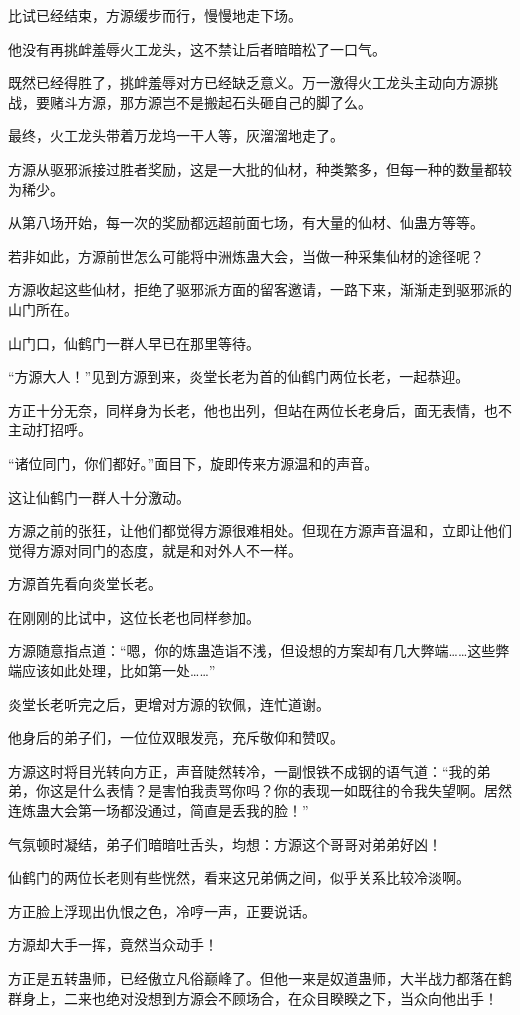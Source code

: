 \begin{this_body}
比试已经结束，方源缓步而行，慢慢地走下场。

他没有再挑衅羞辱火工龙头，这不禁让后者暗暗松了一口气。

既然已经得胜了，挑衅羞辱对方已经缺乏意义。万一激得火工龙头主动向方源挑战，要赌斗方源，那方源岂不是搬起石头砸自己的脚了么。

最终，火工龙头带着万龙坞一干人等，灰溜溜地走了。

方源从驱邪派接过胜者奖励，这是一大批的仙材，种类繁多，但每一种的数量都较为稀少。

从第八场开始，每一次的奖励都远超前面七场，有大量的仙材、仙蛊方等等。

若非如此，方源前世怎么可能将中洲炼蛊大会，当做一种采集仙材的途径呢？

方源收起这些仙材，拒绝了驱邪派方面的留客邀请，一路下来，渐渐走到驱邪派的山门所在。

山门口，仙鹤门一群人早已在那里等待。

“方源大人！”见到方源到来，炎堂长老为首的仙鹤门两位长老，一起恭迎。

方正十分无奈，同样身为长老，他也出列，但站在两位长老身后，面无表情，也不主动打招呼。

“诸位同门，你们都好。”面目下，旋即传来方源温和的声音。

这让仙鹤门一群人十分激动。

方源之前的张狂，让他们都觉得方源很难相处。但现在方源声音温和，立即让他们觉得方源对同门的态度，就是和对外人不一样。

方源首先看向炎堂长老。

在刚刚的比试中，这位长老也同样参加。

方源随意指点道：“嗯，你的炼蛊造诣不浅，但设想的方案却有几大弊端……这些弊端应该如此处理，比如第一处……”

炎堂长老听完之后，更增对方源的钦佩，连忙道谢。

他身后的弟子们，一位位双眼发亮，充斥敬仰和赞叹。

方源这时将目光转向方正，声音陡然转冷，一副恨铁不成钢的语气道：“我的弟弟，你这是什么表情？是害怕我责骂你吗？你的表现一如既往的令我失望啊。居然连炼蛊大会第一场都没通过，简直是丢我的脸！”

气氛顿时凝结，弟子们暗暗吐舌头，均想：方源这个哥哥对弟弟好凶！

仙鹤门的两位长老则有些恍然，看来这兄弟俩之间，似乎关系比较冷淡啊。

方正脸上浮现出仇恨之色，冷哼一声，正要说话。

方源却大手一挥，竟然当众动手！

方正是五转蛊师，已经傲立凡俗巅峰了。但他一来是奴道蛊师，大半战力都落在鹤群身上，二来也绝对没想到方源会不顾场合，在众目睽睽之下，当众向他出手！


\end{this_body}
